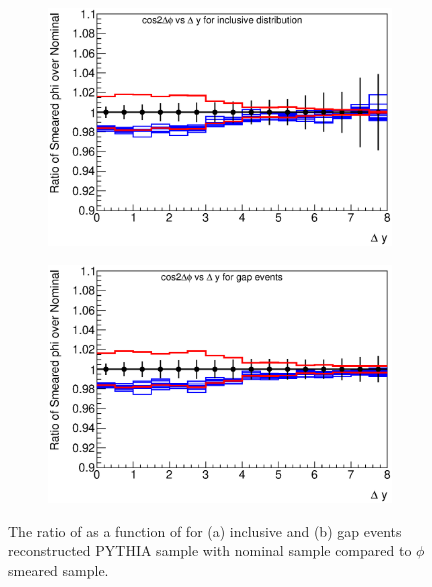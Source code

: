\begin{figure}
\centering
        \begin{subfigure}[b]{0.5\textwidth}
                \centering
                \includegraphics[width=\textwidth]{figures/GBJ2/ResoPhi/RMS_phi___cos2dPhi_deltaY_Ratio.eps}
        \end{subfigure}%
        \begin{subfigure}[b]{0.5\textwidth}
                \centering
                \includegraphics[width=\textwidth]{figures/GBJ2/ResoPhi/RMS_phi___cos2dPhi_deltaY_gap_Ratio.eps}
        \end{subfigure}%
\caption[Uncertainty bands due to the jet $\phi$ resolution for \mean{\costwodphi{}}]{
The ratio of \mean{\costwodphi{}} as a function of \dy{} for (a) inclusive and (b) gap events reconstructed PYTHIA sample with nominal sample compared to $\phi$ smeared sample.
\label{GBJ2:ResoPhi:cos2}}
\end{figure}


